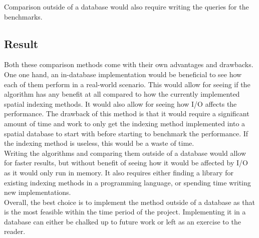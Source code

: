 Comparison outside of a database would also require writing the queries for the benchmarks. 

\subsection{Result}
Both these comparison methods come with their own advantages and drawbacks. One one hand, an in-database implementation would be beneficial to see how each of them perform in a real-world scenario. This would allow for seeing if the algorithm has any benefit at all compared to how the currently implemented spatial indexing methods. It would also allow for seeing how I/O affects the performance. The drawback of this method is that it would require a significant amount of time and work to only get the indexing method implemented into a spatial database to start with before starting to benchmark the performance. If the indexing method is useless, this would be a waste of time. \\

Writing the algorithms and comparing them outside of a database would allow for faster results, but without benefit of seeing how it would be affected by I/O as it would only run in memory. It also requires either finding a library for existing indexing methods in a programming language, or spending time writing new implementations. \\

Overall, the best choice is to implement the method outside of a database as that is the most feasible within the time period of the project. Implementing it in a database can either be chalked up to future work or left as an exercise to the reader.


